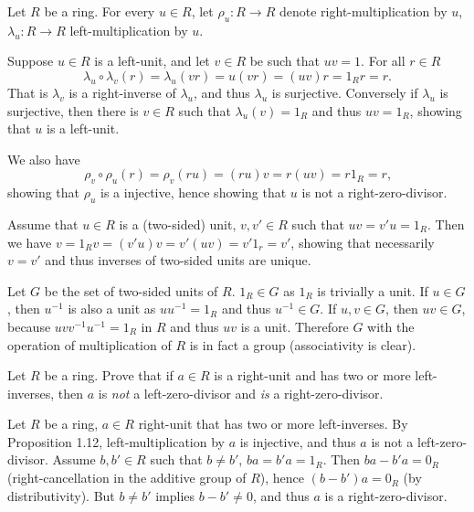 \begin{solution}
	Let $R$ be a ring. For every $u \in R$, let $\rho_u: R \to R$ denote right-multiplication by $u$, $\lambda_u : R \to R$ left-multiplication by $u$.
	
	Suppose $u \in R$ is a left-unit, and let $v \in R$ be such that $uv = 1$. For all $r \in R$
	\[
		\lambda_u \circ \lambda_v (r) = \lambda_u(vr) = u(vr) = (uv)r = 1_R r = r \text{.} 
	\]
	That is $\lambda_v$ is a right-inverse of $\lambda_u$, and thus $\lambda_u$ is surjective. Conversely if $\lambda_u$ is surjective, then there is $v \in R$ such that $\lambda_u(v) = 1_R$ and thus $uv = 1_R$, showing that $u$ is a left-unit.
	
	We also have
	\[
		\rho_v \circ \rho_u (r) = \rho_v (ru) = (ru)v = r(uv) = r 1_R = r \text{,}
	\]
	showing that $\rho_u$ is a injective, hence showing that $u$ is not a right-zero-divisor.
	
	Assume that $u \in R$ is a (two-sided) unit, $v, v' \in R$ such that $uv = v'u = 1_R$. Then we have $v = 1_R v = (v' u) v = v' (u v) = v' 1_r = v'$, showing that necessarily $v = v'$ and thus inverses of two-sided units are unique.
	
	Let $G$ be the set of two-sided units of $R$. $1_R \in G$ as $1_R$ is trivially a unit.  If $u \in G$, then $u^{-1}$ is also a unit as $uu^{-1} = 1_R$ and thus $u^{-1} \in G$. If $u, v \in G$, then $uv \in G$, because $uvv^{-1}u^{-1} = 1_R$ in $R$ and thus $uv$ is a unit. Therefore $G$ with the operation of multiplication of $R$ is in fact a group (associativity is clear).
\end{solution}

\begin{problem}
	Let $R$ be a ring. Prove that if $a \in R$ is a right-unit and has two or more left-inverses, then $a$ is \emph{not} a left-zero-divisor and \emph{is} a right-zero-divisor.
\end{problem}

\begin{solution}
	Let $R$ be a ring, $a \in R$ right-unit that has two or more left-inverses. By Proposition 1.12, left-multiplication by $a$ is injective, and thus $a$ is not a left-zero-divisor. Assume $b, b' \in R$ such that $b \neq b'$, $ba = b'a = 1_R$. Then $ba - b'a = 0_R$ (right-cancellation in the additive group of $R$), hence $(b-b')a = 0_R$ (by distributivity). But $b \neq b'$ implies $b - b' \neq 0$, and thus $a$ is a right-zero-divisor.
\end{solution}

